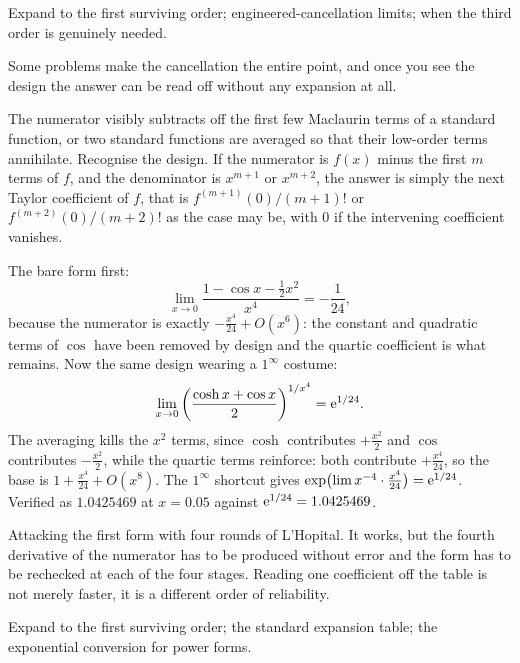 \begin{seealsob}Expand to the first surviving order; engineered-cancellation limits; when the third order is genuinely needed.\end{seealsob}

Some problems make the cancellation the entire point, and once you see the design the answer can be read off without any expansion at all.

\cue The numerator visibly subtracts off the first few Maclaurin terms of a standard function, or two standard functions are averaged so that their low-order terms annihilate.
\method Recognise the design. If the numerator is $f(x)$ minus the first $m$ terms of $f$, and the denominator is $x^{m+1}$ or $x^{m+2}$, the answer is simply the next Taylor coefficient of $f$, that is $f^{(m+1)}(0)/(m+1)!$ or $f^{(m+2)}(0)/(m+2)!$ as the case may be, with $0$ if the intervening coefficient vanishes.

\begin{worked}
The bare form first:
\[
\lim_{x\to0}\frac{1-\cos x-\tfrac12x^{2}}{x^{4}}=-\frac1{24},
\]
because the numerator is exactly $-\tfrac{x^{4}}{24}+O(x^{6})$: the constant and quadratic terms of $\cos$ have been removed by design and the quartic coefficient is what remains. Now the same design wearing a $1^{\infty}$ costume:
\[
\lim_{x\to0}\left(\frac{\cosh x+\cos x}{2}\right)^{1/x^{4}}=\mathrm{e}^{1/24}.
\]
The averaging kills the $x^{2}$ terms, since $\cosh$ contributes $+\tfrac{x^{2}}{2}$ and $\cos$ contributes $-\tfrac{x^{2}}{2}$, while the quartic terms reinforce: both contribute $+\tfrac{x^{4}}{24}$, so the base is $1+\tfrac{x^{4}}{24}+O(x^{8})$. The $1^{\infty}$ shortcut gives $\exp\bigl(\lim x^{-4}\cdot\tfrac{x^{4}}{24}\bigr)=\mathrm{e}^{1/24}$. Verified as $1.0425469$ at $x=0.05$ against $\mathrm{e}^{1/24}=1.0425469$.
\end{worked}

\begin{trap}
Attacking the first form with four rounds of L'Hopital. It works, but the fourth derivative of the numerator has to be produced without error and the form has to be rechecked at each of the four stages. Reading one coefficient off the table is not merely faster, it is a different order of reliability.
\end{trap}

\begin{seealsob}Expand to the first surviving order; the standard expansion table; the exponential conversion for power forms.\end{seealsob}

